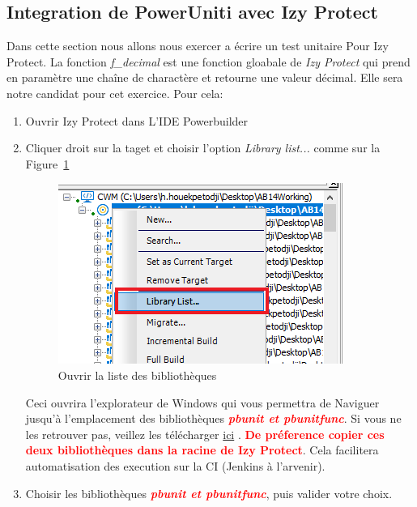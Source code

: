 \documentclass[french]{article}
\theoremstyle{definition}
\begin{document}
\subsection{Integration de PowerUniti avec Izy Protect}
Dans cette section nous allons nous exercer a écrire un test unitaire Pour Izy Protect.
La fonction \textit{f\_decimal} est une fonction gloabale de \textit{Izy Protect} qui prend en paramètre une chaîne de charactère et retourne une valeur décimal.
Elle sera notre candidat pour cet exercice. 
   Pour cela:
\begin{enumerate}
    \item Ouvrir Izy Protect dans L'IDE Powerbuilder
    \item Cliquer droit sur la taget et choisir l'option \textit{Library list...} comme sur la Figure~\ref{fig:librarylist}
    \begin{figure}[!htbp]
        \begin{center}
        \includegraphics[width=.8\linewidth]{./librarylist.png}
        \caption{Ouvrir la liste des bibliothèques}
        \label{fig:librarylist}
        \end{center}
      \end{figure} 
Ceci ouvrira l'explorateur de Windows qui vous permettra de Naviguer jusqu'à l'emplacement des bibliothèques \textcolor{red}{\textit{\textbf{pbunit et pbunitfunc}}}. 
Si vous ne les retrouver pas, veillez les télécharger \href{https://github.com/mahugnon/PowerUnitHonore.git}{ ici} .
\textbf{\textcolor{red}{ De préference copier ces deux bibliothèques dans la racine de Izy Protect}}. 
Cela facilitera automatisation des execution sur la CI (Jenkins à l'arvenir).
\item Choisir les bibliothèques \textcolor{red}{\textit{\textbf{pbunit et pbunitfunc}}}, puis valider votre choix.
\begin{figure}[!htbp]
    \begin{center}

\end{center}
\end{figure}
\end{enumerate}
\end{document}
